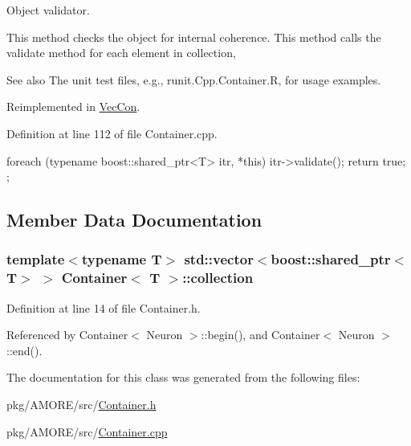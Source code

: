 Object validator. 

This method checks the object for internal coherence. This method calls the validate method for each element in collection, \begin{DoxySeeAlso}{See also}
The unit test files, e.g., runit.Cpp.Container.R, for usage examples. 
\end{DoxySeeAlso}


Reimplemented in \hyperlink{class_vec_con_af008396d3982fb7ccf1af9618b89937c}{VecCon}.



Definition at line 112 of file Container.cpp.


\begin{DoxyCode}
                                                  {
        foreach (typename boost::shared_ptr<T> itr, *this){
                itr->validate();
        }
        return true;
};
\end{DoxyCode}


\subsection{Member Data Documentation}
\hypertarget{class_container_aef055b4e4f94e227cc8a2124af13c177}{
\subsubsection[{collection}]{\setlength{\rightskip}{0pt plus 5cm}template$<$typename T$>$ std::vector$<$boost::shared\_\-ptr$<$T$>$ $>$ {\bf Container}$<$ T $>$::{\bf collection}}}
\label{class_container_aef055b4e4f94e227cc8a2124af13c177}


Definition at line 14 of file Container.h.



Referenced by Container$<$ Neuron $>$::begin(), and Container$<$ Neuron $>$::end().



The documentation for this class was generated from the following files:\begin{DoxyCompactItemize}
\item 
pkg/AMORE/src/\hyperlink{_container_8h}{Container.h}\item 
pkg/AMORE/src/\hyperlink{_container_8cpp}{Container.cpp}\end{DoxyCompactItemize}
